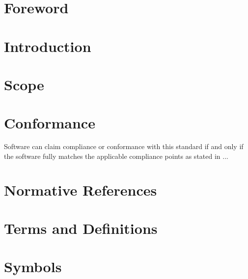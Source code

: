 \documentclass[11pt, showtrims, final, oldfontcommands]{memoir}
\begin{document}
	\pagestyle{companion}
	
	\setupshorttoc
	\setupmaintoc
	\setupparasubsecs
	\tableofcontents
	
	\cleardoublepage
	
	\listoffigures
	\cleardoublepage
	
	\listoftables
	\cleardoublepage
	
	\renewcommand{\clearforchapter}{}
	

	
	\chapter*{Foreword}
	\lipsum*[1]
	\cleardoublepage
	
	\chapter*{Introduction}
	\lipsum*[2]
	\cleardoublepage
	
	\chapter{Scope}
	\lipsum*[3]
	
	\chapter{Conformance}
	Software can claim compliance or conformance with this standard if and only if the software fully matches the applicable compliance points as stated in ...
	
	
	\chapter{Normative References}
	\lipsum*[4]
	
	\chapter{Terms and Definitions}
	\lipsum*[5]
	
	\chapter{Symbols}
	\lipsum*[6]
	
\end{document}
